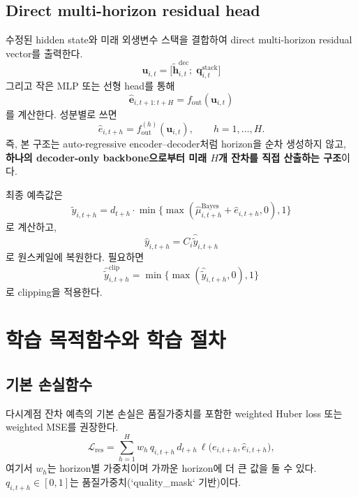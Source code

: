 \documentclass[11pt,a4paper]{article}
\begin{document}
\subsection{Direct multi-horizon residual head}
수정된 hidden state와 미래 외생변수 스택을 결합하여 direct multi-horizon residual vector를 출력한다.
\begin{equation}
    \bm u_{i,t} = \Big[
    \widetilde{\bm h}_{i,t}^{\mathrm{dec}};\;
    \bm q^{\mathrm{stack}}_{i,t}
    \Big]
\end{equation}
그리고 작은 MLP 또는 선형 head를 통해
\begin{equation}
    \hat{\bm e}_{i,t+1:t+H}
    =
    f_{\mathrm{out}}(\bm u_{i,t})
\end{equation}
를 계산한다. 성분별로 쓰면
\begin{equation}
    \hat e_{i,t+h}
    =
    f_{\mathrm{out}}^{(h)}(\bm u_{i,t}),
    \qquad h=1,\dots,H.
\end{equation}
즉, 본 구조는 auto-regressive encoder--decoder처럼 horizon을 순차 생성하지 않고, \textbf{하나의 decoder-only backbone으로부터 미래 $H$개 잔차를 직접 산출하는 구조}이다.

최종 예측값은
\begin{equation}
    \hat{\tilde y}_{i,t+h} = d_{t+h}\cdot \min\{\max(\hat \mu^{\mathrm{Bayes}}_{i,t+h} + \hat e_{i,t+h},0),1\}
    \label{eq:final_forecast}
\end{equation}
로 계산하고,
\begin{equation}
    \hat y_{i,t+h} = C_i \hat{\tilde y}_{i,t+h}
\end{equation}
로 원스케일에 복원한다. 필요하면
\begin{equation}
    \hat{\tilde y}_{i,t+h}^{\mathrm{clip}} = \min\{\max(\hat{\tilde y}_{i,t+h},0),1\}
\end{equation}
로 clipping을 적용한다.

\section{학습 목적함수와 학습 절차}
\subsection{기본 손실함수}
다시계점 잔차 예측의 기본 손실은 품질가중치를 포함한 weighted Huber loss 또는 weighted MSE를 권장한다.
\begin{equation}
    \mathcal L_{\mathrm{res}} = \sum_{h=1}^H w_h \, q_{i,t+h}\, d_{t+h}\,\ell\Big(e_{i,t+h}, \hat e_{i,t+h}\Big),
\end{equation}
여기서 $w_h$는 horizon별 가중치이며 가까운 horizon에 더 큰 값을 둘 수 있다. $q_{i,t+h}\in[0,1]$는 품질가중치(`quality_mask` 기반)이다.
\end{document}

